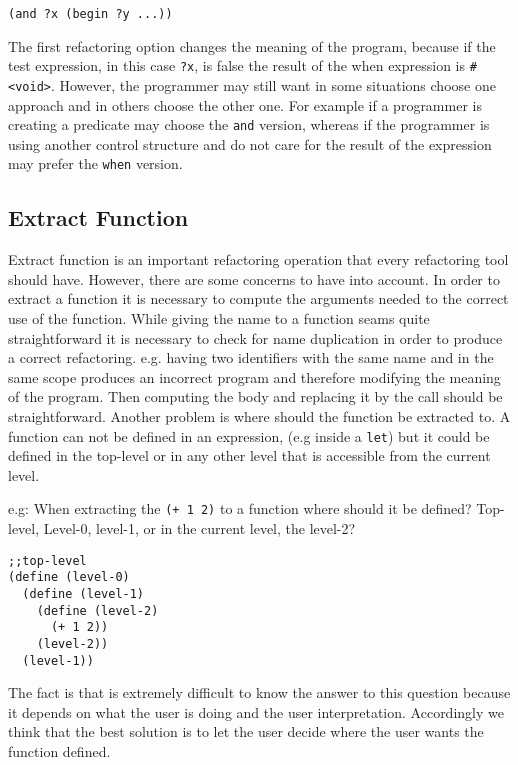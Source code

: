 \begin{lstlisting}[basicstyle=\ttfamily, caption="Refactoring option 2"]
(and ?x (begin ?y ...))
\end{lstlisting}

The first refactoring option changes the meaning of the program, because if the
test expression, in this case {\tt ?x}, is false the result of the when expression is {\tt \#<void>}.
However, the programmer may still want in some situations choose one approach and in others
choose the other one. For example if a programmer is creating a predicate may
choose the {\tt and} version, whereas if the programmer is using another control structure
and do not care for the result of the expression may prefer the {\tt when} version.

\subsection{Extract Function}
Extract function is an important refactoring operation that every refactoring tool
should have.
However, there are some concerns to have into account.
In order to extract a function it is necessary to compute the arguments needed
to the correct use of the function.
While giving the name to a function seams quite straightforward it is necessary to
check for name duplication in order to produce a correct refactoring. e.g. having
two identifiers with the same name and in the same scope produces an incorrect program
and therefore modifying the meaning of the program.
Then computing the body and replacing it by the call should be straightforward.
Another problem is where should the function be extracted to. A function can not
be defined in an expression, (e.g inside a {\tt let}) but it could be defined in the top-level
or in any other level that is accessible from the current level.

e.g: When extracting the {\tt (+ 1 2)} to a function where should it be defined?
Top-level, Level-0, level-1, or in the current level, the level-2?
\begin{lstlisting}[basicstyle=\ttfamily, caption="Extract function levels"]
;;top-level
(define (level-0)
  (define (level-1)
    (define (level-2)
      (+ 1 2))
    (level-2))
  (level-1))
\end{lstlisting}

The fact is that is extremely difficult to know the answer to this question because
it depends on what the user is doing and the user interpretation.
Accordingly we think that the best solution is to let the user decide where
the user wants the function defined.


